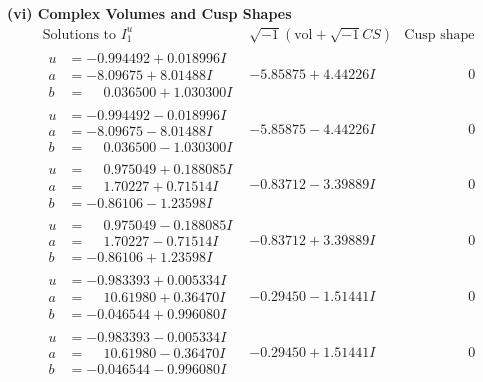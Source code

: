 \documentclass[1p]{elsarticle_modified}
\theoremstyle{definition}
\newcommand{\I}{\sqrt{-1}}
\begin{document}
\newpage\flushleft \textbf{(vi) Complex Volumes and Cusp Shapes}
$$\begin{array}{c|c|c}  
\text{Solutions to }I^u_{1}& \I (\text{vol} + \sqrt{-1}CS) & \text{Cusp shape}\\
 \hline 
\begin{aligned}
u &= -0.994492 + 0.018996 I \\
a &= -8.09675 + 8.01488 I \\
b &= \phantom{-}0.036500 + 1.030300 I\end{aligned}
 & -5.85875 + 4.44226 I & \phantom{-0.000000 } 0 \\ \hline\begin{aligned}
u &= -0.994492 - 0.018996 I \\
a &= -8.09675 - 8.01488 I \\
b &= \phantom{-}0.036500 - 1.030300 I\end{aligned}
 & -5.85875 - 4.44226 I & \phantom{-0.000000 } 0 \\ \hline\begin{aligned}
u &= \phantom{-}0.975049 + 0.188085 I \\
a &= \phantom{-}1.70227 + 0.71514 I \\
b &= -0.86106 - 1.23598 I\end{aligned}
 & -0.83712 - 3.39889 I & \phantom{-0.000000 } 0 \\ \hline\begin{aligned}
u &= \phantom{-}0.975049 - 0.188085 I \\
a &= \phantom{-}1.70227 - 0.71514 I \\
b &= -0.86106 + 1.23598 I\end{aligned}
 & -0.83712 + 3.39889 I & \phantom{-0.000000 } 0 \\ \hline\begin{aligned}
u &= -0.983393 + 0.005334 I \\
a &= \phantom{-}10.61980 + 0.36470 I \\
b &= -0.046544 + 0.996080 I\end{aligned}
 & -0.29450 - 1.51441 I & \phantom{-0.000000 } 0 \\ \hline\begin{aligned}
u &= -0.983393 - 0.005334 I \\
a &= \phantom{-}10.61980 - 0.36470 I \\
b &= -0.046544 - 0.996080 I\end{aligned}
 & -0.29450 + 1.51441 I & \phantom{-0.000000 } 0 \\ \hline\begin{aligned}

\end{aligned}
\end{array}$$
\end{document}
